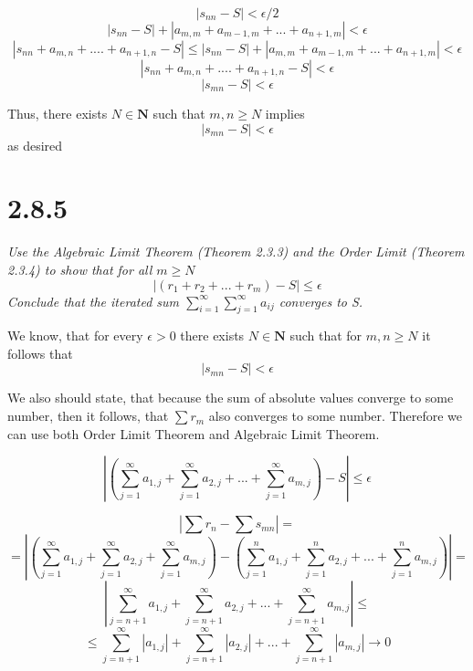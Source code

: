 \documentclass[11pt,oneside,titlepage]{article}
\begin{document}
$$|s_{nn} - S| < \epsilon/2$$
$$|s_{nn} - S| + |a_{m,m} + a_{m - 1, m} + ... + a_{n + 1,m}| < \epsilon$$
$$|s_{nn} + a_{m, n} + .... + a_{n + 1, n} - S| \leq |s_{nn} - S| + |a_{m,m} + a_{m - 1, m} + ... + a_{n + 1,m}| <  \epsilon$$
$$|s_{nn} + a_{m, n} + .... + a_{n + 1, n} - S| < \epsilon$$
$$|s_{mn}  - S| < \epsilon$$

Thus, there exists $N \in \textbf{N}$ such that $m, n \geq N$ implies
$$|s_{mn} - S| < \epsilon$$
as desired

\section*{2.8.5}
\textit{Use the Algebraic Limit Theorem (Theorem 2.3.3) and the Order Limit
  (Theorem 2.3.4) to show that for all $m \geq N$}
$$|(r_1 + r_2 + ... + r_m) - S| \leq  \epsilon$$
\textit{Conclude that the iterated sum
  $\sum_{i=1}^{\infty}\sum_{j=1}^{\infty} a_{ij}$ converges to S.}

We know, that for every $\epsilon > 0$  there exists $N \in \textbf{N}$ such
that for $m,n \geq N$ it follows that
$$|s_{mn} - S| < \epsilon$$

We also should state, that because the sum of absolute values converge
to some number, then it follows, that $\sum r_m$ also converges to some number.
Therefore we can use both Order Limit Theorem and Algebraic Limit Theorem.

$$\left|\left(\sum_{j = 1}^{\infty}a_{1,j} + \sum_{j = 1}^{\infty}a_{2,j} + ... + \sum_{j = 1}^{\infty}a_{m,j}\right) - S\right| \leq  \epsilon$$



$$\left|\sum r_n - \sum s_{mn}\right| = $$
$$ = \left|(\sum_{j=1}^{\infty} a_{1,j} + \sum_{j=1}^{\infty} a_{2,j} + \sum_{j=1}^{\infty} a_{m,j})
  - (\sum_{j=1}^{n} a_{1,j} + \sum_{j=1}^{n} a_{2,j} + ... + \sum_{j=1}^{n} a_{m,j})\right| = $$
$$\left|\sum_{j = n + 1}^{\infty} a_{1,j} + \sum_{j = n + 1}^{\infty} a_{2,j} + ...
  + \sum_{j = n + 1}^{\infty} a_{m,j} \right| \leq $$
$$
\leq \sum_{j = n + 1}^{\infty} |a_{1,j}| + \sum_{j = n + 1}^{\infty} |a_{2,j}| + ...
+ \sum_{j = n + 1}^{\infty} |a_{m,j}|  \to 0
$$
\end{document}
